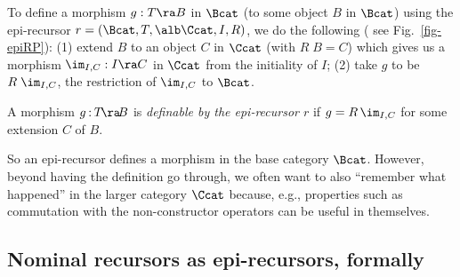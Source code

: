 To define a morphism $g: T \ra B$ in $\Bcat$ (to some object $B$ in $\Bcat$) using the epi-recursor $r = (\Bcat,T,\alb\Ccat,I,R)$, we do the following (%
see Fig.~\ref{fig-epiRP}): 
	(1) extend $B$ to an object $C$ in $\Ccat$ (with $R\;B = C$) which gives us a morphism $\im_{I,C} : I \ra C$ in $\Ccat$ from the initiality of $I$; 
(2) take $g$ to be $R\;\im_{I,C}$, the restriction of $\im_{I,C}$ to $\Bcat$. 
%

\begin{defi}\rm \label{defi-definab}
\hspace*{-1ex}
A morphism %
$g \hspace*{-0.2ex}:\hspace*{-0.2ex} T \!\ra\! B$  is \emph{definable by the 
	epi-recursor $r$} if %
$g = R \,\im_{I,C}$ for some extension $C$ of $B$.   
{}
\end{defi} 

So an epi-recursor defines a morphism in the base category $\Bcat$. However, 
beyond having the definition %
go through, we often want to also 
``remember what happened'' in the larger category $\Ccat$ because, %
e.g., 
properties such as 
commutation with the non-constructor operators can be useful in themselves. 


\vspace*{-0.5ex}
\subsection{Nominal recursors as epi-recursors, formally}
\label{subsec-nomrecAsEpirecFormally}

